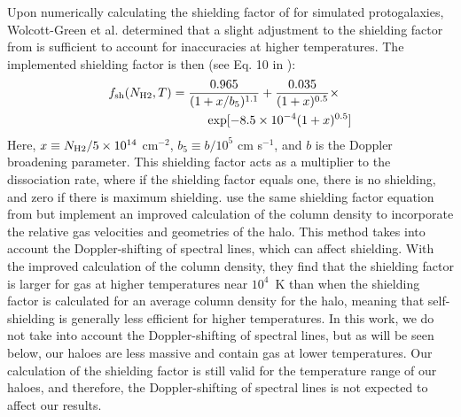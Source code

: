 \documentclass[fleqn,usenatbib]{mnras}
\begin{document}
Upon numerically calculating the shielding factor of \hh{} for simulated protogalaxies, Wolcott-Green et al. determined that a slight adjustment to the shielding factor from \citet{Draine96} is sufficient to account for inaccuracies at higher temperatures. The implemented shielding factor is then (see Eq. 10 in \citet{Wolcott11}):
\begin{equation} \label{shield}
	\begin{multlined}
	f_{\rm sh}(N_{\rm H2}, T) = \frac{0.965}{(1+x/b_{5})^{1.1}} + \frac{0.035}{(1+x)^{0.5}}  \times \\ \exp [-8.5 \times 10^{-4} (1+x)^{0.5}]
	\end{multlined}
\end{equation}
Here, $x \equiv N_{\rm H2}/5 \times 10^{14}$ cm$^{-2}$, $b_{5} \equiv b/10^{5}$ cm s$^{-1}$, and $b$ is the Doppler broadening parameter. This shielding factor acts as a multiplier to the \hh{} dissociation rate, where if the shielding factor equals one, there is no shielding, and zero if there is maximum shielding. \citet{Hartwig15} use the same shielding factor equation from \citet{Wolcott11} but implement an improved calculation of the column density to incorporate the relative gas velocities and geometries of the halo. This method takes into account the Doppler-shifting of spectral lines, which can affect \hh{} shielding. With the improved calculation of the column density, they find that the shielding factor is larger for gas at higher temperatures near $10^4$~K than when the shielding factor is calculated for an average column density for the halo, meaning that self-shielding is generally less efficient for higher temperatures. In this work, we do not take into account the Doppler-shifting of spectral lines, but as will be seen below, our haloes are less massive and contain gas at lower temperatures. Our calculation of the shielding factor is still valid for the temperature range of our haloes, and therefore, the Doppler-shifting of spectral lines is not expected to affect our results.

\end{document}
